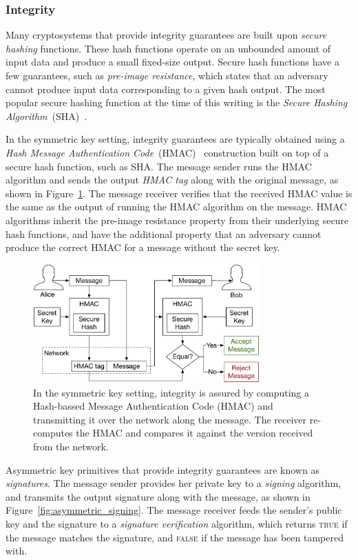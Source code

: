 \subsubsection{Integrity}

Many cryptosystems that provide integrity guarantees are built upon
\textit{secure hashing} functions. These hash functions operate on an unbounded
amount of input data and produce a small fixed-size output. Secure hash
functions have a few guarantees, such as \textit{pre-image resistance}, which
states that an adversary cannot produce input data corresponding to a given
hash output. The most popular secure hashing function at the time of this
writing is the \textit{Secure Hashing Algorithm}~(SHA)~\cite{eastlake2001sha1}.

In the symmetric key setting, integrity guarantees are typically obtained using
a \textit{Hash Message Authentication Code}~(HMAC)~\cite{krawczyk1997hmac}
construction built on top of a secure hash function, such as SHA. The message
sender runs the HMAC algorithm and sends the output \textit{HMAC tag} along
with the original message, as shown in Figure~\ref{fig:symmetric_hmac}. The
message receiver verifies that the received HMAC value is the same as the
output of running the HMAC algorithm on the message. HMAC algorithms inherit
the pre-image resistance property from their underlying secure hash functions,
and have the additional property that an adversary cannot produce the correct
HMAC for a message without the secret key.

\begin{figure}[hbt]
  \centering
  \includegraphics[width=87mm]{figures/symmetric_hmac.pdf}
  \caption{
    In the symmetric key setting, integrity is assured by computing a
    Hash-bassed Message Authentication Code (HMAC) and transmitting it over the
    network along the message. The receiver re-computes the HMAC and compares
    it against the version received from the network.
  }
  \label{fig:symmetric_hmac}
\end{figure}

Asymmetric key primitives that provide integrity guarantees are known as
\textit{signatures}. The message sender provides her private key to a
\textit{signing} algorithm, and transmits the output signature along with the
message, as shown in Figure~\ref{fig:asymmetric_signing}. The message receiver
feeds the sender's public key and the signature to a \textit{signature
verification} algorithm, which returns \textsc{true} if the message matches the
signature, and \textsc{false} if the message has been tampered with.

